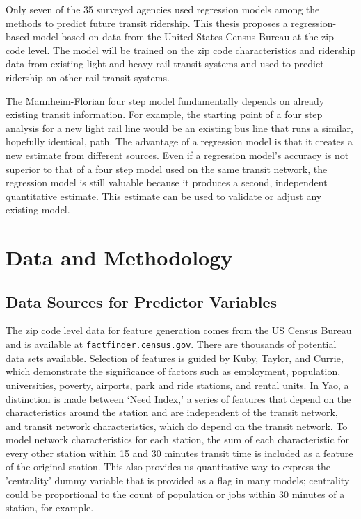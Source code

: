 \documentclass{article}
\begin{document}
Only seven of the 35 surveyed agencies used regression models among the methods to predict future transit ridership. This thesis proposes a regression-based model based on data from the United States Census Bureau at the zip code level. The model will be trained on the zip code characteristics and ridership data from existing light and heavy rail transit systems and used to predict ridership on other rail transit systems.  

The Mannheim-Florian four step model fundamentally depends on already existing transit information. For example, the starting point of a four step analysis for a new light rail line would be an existing bus line that runs a similar, hopefully identical, path. The advantage of a regression model is that it creates a new estimate from different sources. Even if a regression model's accuracy is not superior to that of a four step model used on the same transit network, the regression model is still valuable because it produces a second, independent quantitative estimate. This estimate can be used to validate or adjust any existing model. 


\section{Data and Methodology}

\subsection{Data Sources for Predictor Variables}

The zip code level data for feature generation comes from the US Census Bureau and is available at \texttt{factfinder.census.gov}. There are thousands of potential data sets available. Selection of features is guided by Kuby\cite{Kuby2004}, Taylor\cite{Taylor2008}, and Currie\cite{Currie2011}, which demonstrate the significance of factors such as employment, population, universities, poverty, airports, park and ride stations, and rental units. In Yao\cite{Yao2007}, a distinction is made between `Need Index,' a series of features that depend on the characteristics around the station and are independent of the transit network, and transit network characteristics, which do depend on the transit network. To model network characteristics for each station, the sum of each characteristic for every other station within 15 and 30 minutes transit time is included as a feature of the original station. This also provides us quantitative way to express the 'centrality' dummy variable that is provided as a flag in many models\cite{Kuby2004, Durning2015}; centrality could be proportional to the count of population or jobs within 30 minutes of a station, for example.
\end{document}
